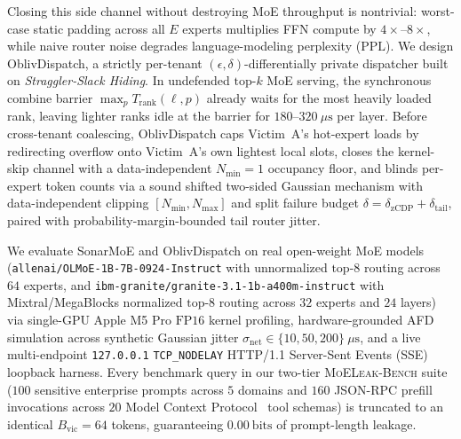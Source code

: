 \documentclass[10pt,journal,compsoc]{IEEEtran}
\def\SM{SonarMoE}%
\def\OD{OblivDispatch}%
\theoremstyle{definition}
\theoremstyle{remark}
\newcommand{\SM}{\textsc{SonarMoE}}
\newcommand{\OD}{\textsc{OblivDispatch}}
\newcommand{\MLB}{\textsc{MoELeak-Bench}}
\begin{document}
Closing this side channel without destroying MoE throughput is nontrivial: worst-case static padding across all $E$ experts multiplies FFN compute by $4\times$--$8\times$, while naive router noise degrades language-modeling perplexity ($\mathrm{PPL}$). We design \OD{}, a strictly per-tenant $(\epsilon, \delta)$-differentially private dispatcher built on \emph{Straggler-Slack Hiding}. In undefended $\text{top-}k$ MoE serving, the synchronous combine barrier $\max_{p} T_{\mathrm{rank}}(\ell, p)$ already waits for the most heavily loaded rank, leaving lighter ranks idle at the barrier for $180$--$320~\mu\mathrm{s}$ per layer. Before cross-tenant coalescing, \OD{} caps Victim~A's hot-expert loads by redirecting overflow onto Victim~A's own lightest local slots, closes the kernel-skip channel with a data-independent $N_{\min} = 1$ occupancy floor, and blinds per-expert token counts via a sound shifted two-sided Gaussian mechanism with data-independent clipping $[N_{\min}, N_{\max}]$ and split failure budget $\delta = \delta_{\mathrm{zCDP}} + \delta_{\mathrm{tail}}$, paired with probability-margin-bounded tail router jitter.

We evaluate \SM{} and \OD{} on real open-weight MoE models (\texttt{allenai/OLMoE-1B-7B-0924-Instruct} with unnormalized $\text{top-}8$ routing across $64$ experts, and \texttt{ibm-granite/\allowbreak granite-3.1-1b-a400m-instruct} with Mixtral/MegaBlocks normalized $\text{top-}8$ routing across $32$ experts and $24$ layers) via single-GPU Apple M5 Pro $\mathrm{FP16}$ kernel profiling, hardware-grounded AFD simulation across synthetic Gaussian jitter $\sigma_{\mathrm{net}} \in \{10, 50, 200\}~\mu\mathrm{s}$, and a live multi-endpoint \texttt{127.0.0.1} \texttt{TCP\_NODELAY} HTTP/1.1 Server-Sent Events (SSE) loopback harness. Every benchmark query in our two-tier \MLB{} suite ($100$ sensitive enterprise prompts across $5$ domains and $160$ JSON-RPC prefill invocations across $20$ Model Context Protocol~\cite{anthropic2024mcp,patil2024bfcl} tool schemas) is truncated to an identical $B_{\mathrm{vic}} = 64$ tokens, guaranteeing $0.00~\mathrm{bits}$ of prompt-length leakage.
\end{document}
